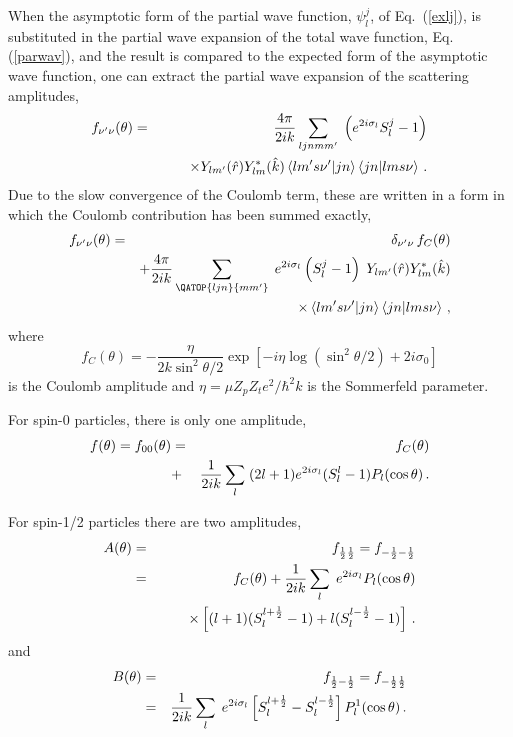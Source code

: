 When the asymptotic form of the partial wave function, $\psi_{l}^{j}$, of
Eq.~(\ref{exlj}), is substituted in the partial wave expansion of the total
wave function, Eq. (\ref{parwav}), and the result is compared to the
expected form of the asymptotic wave function, one can extract the partial
wave expansion of the scattering amplitudes,
\begin{eqnarray}
f_{\nu^{\prime}\nu}(\theta) &=& \frac{4\pi}{2ik}\sum_{{{{ljn}{
mm^{\prime}}}}}\;\left(e^{2i\sigma_{l}}S_{l}^{j}-1\right) \\
&& \qquad\times Y_{lm^{\prime}}(\hat{r})Y_{lm}^{*}(\hat{k})\left\langle
lm^{\prime}s\nu^{\prime}|jn\right\rangle \left\langle jn|lms\nu\right\rangle
\,.  \notag
\end{eqnarray}
Due to the slow convergence of the Coulomb term, these are written in a form
in which the Coulomb contribution has been summed exactly,%
\begin{eqnarray}
f_{\nu^{\prime}\nu}(\theta) & = & \delta_{\nu^{\prime}\nu}\, f_{C}(\theta) \\
& & +\frac{4\pi}{2ik}\sum_{{{\QATOP{ljn}{mm^{\prime}}}}}\;
e^{2i\sigma_{l}}\left(S_{l}^{j}-1\right)\; Y_{lm^{\prime}}(\hat{r}%
)Y_{lm}^{*}(\hat{k})  \notag \\
& & \qquad\qquad\times\left\langle lm^{\prime}s\nu^{\prime}|jn\right\rangle
\left\langle jn|lms\nu\right\rangle \,,  \notag
\end{eqnarray}
where
\begin{equation}
f_{C}(\theta)=-\frac{\eta}{2k\sin^{2}\theta/2}\exp\left[-i\eta\log\left(%
\sin^{2}\theta/2\right)+2i\sigma_{0}\right]
\end{equation}
is the Coulomb amplitude and $\eta=\mu Z_p Z_t e^2/\hbar^2 k $ is the
Sommerfeld parameter.

For spin-0 particles, there is only one amplitude,
\begin{eqnarray}
f(\theta)=f_{00}(\theta) & = & f_{C}(\theta) \\
& + & \frac{1}{2ik}\sum_{l}\;(2l+1)e^{2i\sigma_{l}}(S_{l}^{l}-1)P_{l}(\cos%
\theta)\,.  \notag
\end{eqnarray}

For spin-1/2 particles there are two amplitudes,
\begin{eqnarray}
A(\theta) & = & f_{\frac{1}{2}\frac{1}{2}}=f_{-\frac{1}{2}-\frac{1}{2}} \\
& = & f_{C}(\theta)+\frac{1}{2ik}\sum_{l}\; e^{2i\sigma_{l}}P_{l}(\cos\theta)
\notag \\
& & \qquad\times\left[(l+1)(S_{l}^{l+\frac{1}{2}}-1)+l(S_{l}^{l-\frac{1}{2}%
}-1)\right]\,.  \notag
\end{eqnarray}
and
\begin{eqnarray}
B(\theta) & = & f_{\frac{1}{2}-\frac{1}{2}}=f_{-\frac{1}{2}\frac{1}{2}} \\
& = & \frac{1}{2ik}\sum_{l}\; e^{2i\sigma_{l}}\left[S_{l}^{l+\frac{1}{2}%
}-S_{l}^{l-\frac{1}{2}}\right]P_{l}^{1}(\cos\theta)\,.  \notag
\end{eqnarray}

